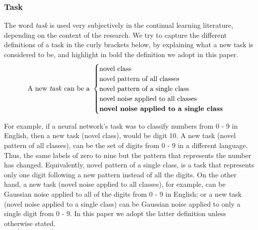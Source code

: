 \subsubsection{Task}
The word \textit{task} is used very subjectively in the continual learning literature, depending on the context of the research. 
%
We try to capture the different definitions of a task in the curly brackets below, by explaining what a new task is considered to be, and highlight in bold the definition we adopt in this paper.
%
\begin{equation*}
  \text{A new \textit{task} can be a~} 
    \begin{cases}
     \text{novel class}\\
      \text{novel pattern of all classes}\\
      \text{novel pattern of a single class}\\
      \text{novel noise applied to all classes}\\
      \text{\textbf{novel noise applied to a single class}}
    \end{cases}       
\end{equation*}

For example, if a neural network's task was to classify numbers from 0 - 9 in English, then a new task (novel class), would be digit 10.
%
A new task (novel pattern of all classes), can be the set of digits from 0 - 9 in a different language. Thus, the same labels of zero to nine but the pattern that represents the number has changed.
%
Equivalently, novel pattern of a single class, is a task that represents only one digit following a new pattern instead of all the digits.  
%
On the other hand, a new task (novel noise applied to all classes), for example, can be Gaussian noise applied to all of the digits from 0 - 9 in English; or a new task (novel noise applied to a single class) can be Gaussian noise applied to only a single digit from 0 - 9.  In this paper we adopt the latter definition unless otherwise stated.  




